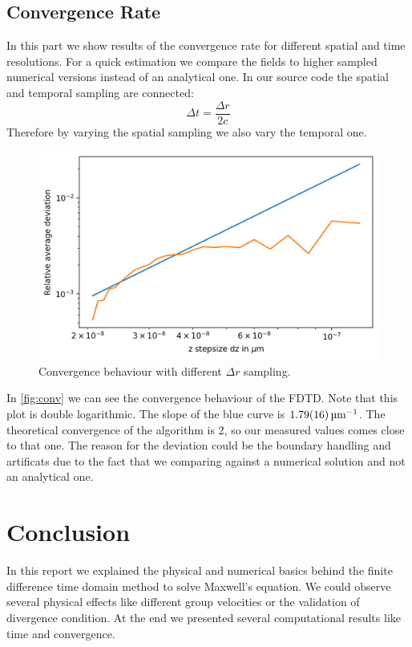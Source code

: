 \documentclass[a4paper,12pt]{scrartcl}
\begin{document}
    \subsection{Convergence Rate}
        In this part we show results of the convergence rate for different spatial and time resolutions.
        For a quick estimation we compare the fields to higher sampled numerical versions instead of an analytical one.
        In our source code the spatial and temporal sampling are connected:
        \begin{equation}
            \Delta t = \frac{\Delta r}{2 c}
        \end{equation}
        Therefore by varying the spatial sampling we also vary the temporal one.
        \begin{figure}[H]
            \centering
            \includegraphics[width=.8\textwidth]{figures/index.png}
            \caption{Convergence behaviour with different $\Delta r$ sampling.}
            \label{fig:conv}
        \end{figure}
        In \autoref{fig:conv} we can see the convergence behaviour of the FDTD. Note that this plot is double logarithmic.
        The slope of the blue curve is $\SI{1.79\pm0.16}{\per\micro\meter}$. The theoretical convergence of the algorithm is 2, so our measured values comes close to that one.
        The reason for the deviation could be the boundary handling and artificats due to the fact that we comparing against a numerical solution and not an analytical one.
        
\section{Conclusion}
    In this report we explained the physical and numerical basics 
    behind the finite difference time domain method to solve Maxwell's equation. We could observe several physical effects like different group velocities or the validation of divergence condition.
    At the end we presented several computational results like time and convergence.
    
\newpage
\nocite{*}
\printbibliography
\end{document}
